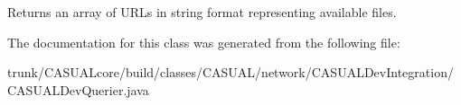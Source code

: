 \begin{DoxyReturn}{Returns}
an array of U\-R\-Ls in string format representing available files. 
\end{DoxyReturn}


The documentation for this class was generated from the following file\-:\begin{DoxyCompactItemize}
\item 
trunk/\-C\-A\-S\-U\-A\-Lcore/build/classes/\-C\-A\-S\-U\-A\-L/network/\-C\-A\-S\-U\-A\-L\-Dev\-Integration/C\-A\-S\-U\-A\-L\-Dev\-Querier.\-java\end{DoxyCompactItemize}
